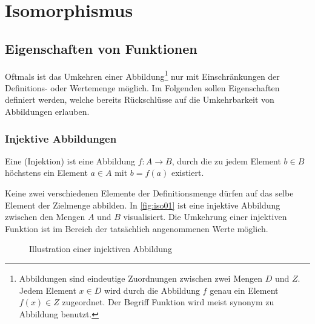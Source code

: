 \section{Isomorphismus}
\subsection{Eigenschaften von Funktionen}
Oftmals ist das Umkehren einer Abbildung\footnote{Abbildungen sind eindeutige Zuordnungen zwischen zwei Mengen $D$ und $Z$. Jedem Element $x \in D$ wird durch die Abbildung $f$ genau ein Element $f(x) \in Z$ zugeordnet. Der Begriff Funktion wird meist synonym zu Abbildung benutzt.} nur mit Einschränkungen der Definitions- oder Wertemenge möglich. Im Folgenden sollen Eigenschaften definiert werden, welche bereits Rückschlüsse auf die Umkehrbarkeit von Abbildungen erlauben.
\subsubsection{Injektive Abbildungen}

\begin{df}Eine  (Injektion) ist eine Abbildung $f:A \rightarrow B$, durch die zu jedem Element $b \in B$ höchstens ein Element $a \in A$ mit $b=f(a)$ existiert.
\end{df}
Keine zwei verschiedenen Elemente der Definitionsmenge dürfen auf das selbe Element der Zielmenge abbilden. In \autoref{fig:iso01} ist eine injektive Abbildung zwischen den Mengen $A$ und $B$ visualisiert. Die Umkehrung einer injektiven Funktion ist im Bereich der tatsächlich angenommenen Werte möglich.

\begin{figure}[!h]
\centering
{}
\caption{Illustration einer injektiven Abbildung}\label{fig:iso01}
\end{figure}

